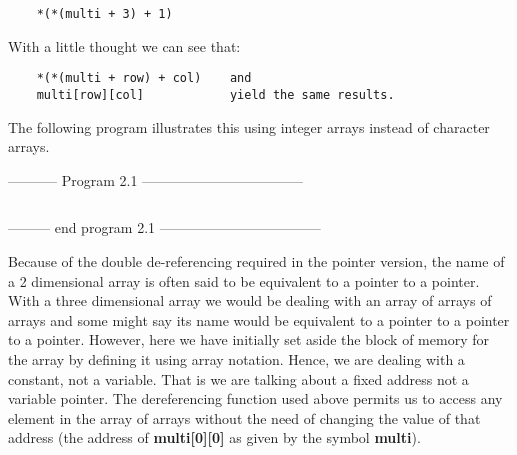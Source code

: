 \begin{verbatim}
    *(*(multi + 3) + 1)
\end{verbatim}

With a little thought we can see that:

\begin{verbatim}
    *(*(multi + row) + col)    and
    multi[row][col]            yield the same results.
\end{verbatim}

The following program illustrates this using integer arrays instead of
character arrays.

-----------  Program 2.1  -----------------------------------
\inputminted[breaklines]{c}{../src/ch2-1.c}
--------- end program 2.1 -----------------------------------

Because of the double de-referencing required in the pointer version,
the name of a 2 dimensional array is often said to be equivalent to a
pointer to a pointer. With a three dimensional array we would be dealing
with an array of arrays of arrays and some might say its name would be
equivalent to a pointer to a pointer to a pointer. However, here we have
initially set aside the block of memory for the array by defining it
using array notation. Hence, we are dealing with a constant, not a
variable. That is we are talking about a fixed address not a variable
pointer. The dereferencing function used above permits us to access any
element in the array of arrays without the need of changing the value of
that address (the address of \textbf{multi{[}0{]}{[}0{]}} as given by
the symbol \textbf{multi}).

\begin{comment}
\href{ch7x.htm}{Chapter 7: More on Multi-Dimensional Arrays}

\href{pointers.htm}{Back to Table of Contents}
\end{comment}
